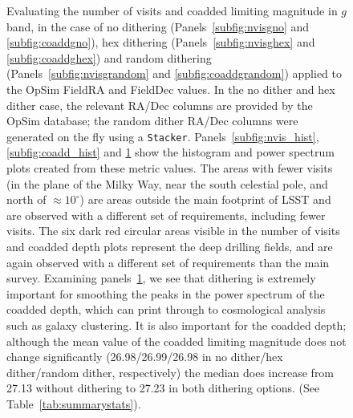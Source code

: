 \documentclass[]{spie}  %
\begin{document}
\begin{figure}
\begin{subfigure}[]{0.3\textwidth}
\caption[]{}
\label{subfig:coadd_ps}
\end{subfigure}
\caption[]
{\label{fig:dither_nvis_coadd}
Evaluating the number of visits and coadded limiting magnitude in $g$
band, in the case of no dithering (Panels~\ref{subfig:nvisgno} and
\ref{subfig:coaddgno}), hex dithering (Panels~\ref{subfig:nvisghex}
and \ref{subfig:coaddghex}) and random dithering
(Panels~\ref{subfig:nvisgrandom} and \ref{subfig:coaddgrandom})
applied to the OpSim FieldRA and FieldDec values. In the no dither and
hex dither case, the relevant RA/Dec columns are provided by the OpSim
database; the random dither RA/Dec columns were generated on the fly
using a {\tt Stacker}. Panels~\ref{subfig:nvis_hist},
\ref{subfig:coadd_hist} and \ref{subfig:coadd_ps} show the histogram
and power spectrum plots created from these metric values. The areas
with fewer visits (in the plane of the Milky Way, near the south
celestial pole, and north of
$\approx 10^{\circ}$) are areas
outside the main footprint of LSST and are observed with a different
set of requirements, including fewer visits. The six dark red circular
areas visible in the number of visits and coadded depth plots
represent the deep drilling fields, and are again observed with a
different set of requirements than the main survey. Examining
panels~\ref{subfig:coadd_ps}, we see that dithering
is extremely important for smoothing the peaks in the power spectrum
of the coadded depth, which can print through to cosmological analysis
such as galaxy clustering. It is also important for the coadded depth;
although the mean value of the coadded limiting magnitude does not
change significantly (26.98/26.99/26.98 in no dither/hex dither/random
dither, respectively) the median does increase from 27.13 without
dithering to 27.23 in both dithering options. (See Table~\ref{tab:summarystats}).}
\end{figure}
\end{document}
